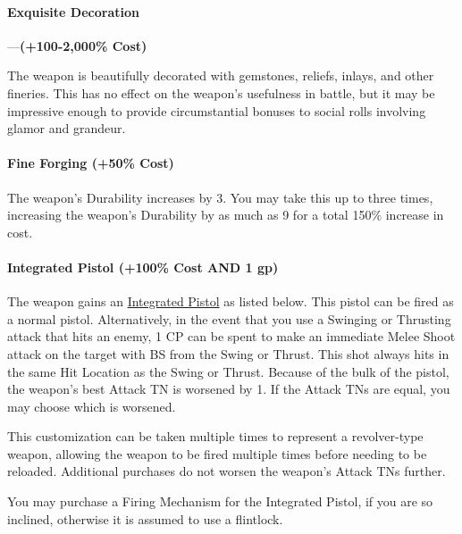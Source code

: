\documentclass[oneside,11pt,english]{book}
\begin{document}
\paragraph{Exquisite Decoration}---\quad \textbf{(+100-2,000\% Cost)} \par
The weapon is beautifully decorated with gemstones, reliefs, inlays, and other fineries. This has no effect on the weapon’s usefulness in battle, but it may be impressive enough to provide circumstantial bonuses to social rolls involving glamor and grandeur.

\paragraph{Fine Forging (+50\% Cost)}\par
The weapon’s Durability increases by 3. You may take this up to three times, increasing the weapon’s Durability by as much as 9 for a total 150\% increase in cost.

\paragraph{Integrated Pistol (+100\% Cost AND 1 gp)}\par
The weapon gains an \hyperref[tab:Integrated Firearms]{Integrated Pistol} as listed below. This pistol can be fired as a normal pistol. Alternatively, in the event that you use a Swinging or Thrusting attack that hits an enemy, 1 CP can be spent to make an immediate Melee Shoot attack on the target with BS from the Swing or Thrust. This shot always hits in the same Hit Location as the Swing or Thrust. Because of the bulk of the pistol, the weapon’s best Attack TN is worsened by 1. If the Attack TNs are equal, you may choose which is worsened.

This customization can be taken multiple times to represent a revolver-type weapon, allowing the weapon to be fired multiple times before needing to be reloaded. Additional purchases do not worsen the weapon’s Attack TNs further.

You may purchase a Firing Mechanism for the Integrated Pistol, if you are so inclined, otherwise it is assumed to use a flintlock.
\end{document}
